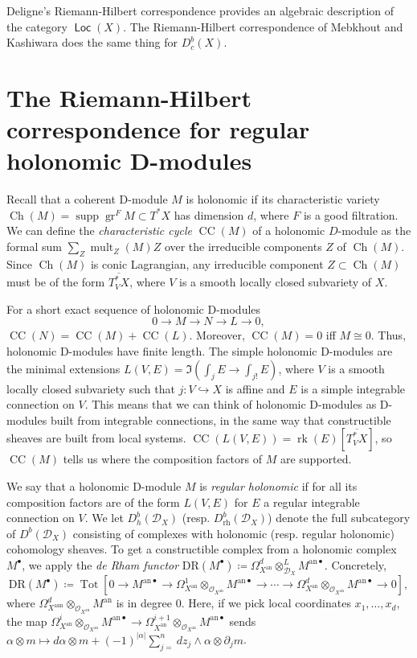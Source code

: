 \documentclass[leqno, openany]{memoir}
\theoremstyle{definition}
\theoremstyle{remark}
\theoremstyle{plain}
\theoremstyle{definition}
\theoremstyle{remark}
\newcommand{\mc}[1]{\mathcal{#1}}
\newcommand{\mr}[1]{\mathrm{#1}}
\newcommand{\on}[1]{\operatorname{#1}}
\newcommand{\ms}[1]{\mathsf{#1}}
\DeclareMathOperator{\supp}{supp}
\DeclareMathOperator{\Loc}{\ms{Loc}}
\DeclareMathOperator{\gr}{gr}
\DeclareMathOperator{\Ch}{Ch}
\DeclareMathOperator{\CC}{CC}
\DeclareMathOperator{\mult}{mult}
\DeclareMathOperator{\Tot}{Tot}
\begin{document}
Deligne's Riemann-Hilbert correspondence provides an algebraic description of the category $\Loc(X)$. The Riemann-Hilbert correspondence of Mebkhout and Kashiwara does the same thing for $D_c^b(X)$.

\section{The Riemann-Hilbert correspondence for regular holonomic D-modules}
Recall that a coherent D-module $M$ is holonomic if its characteristic variety $\Ch(M) = \supp\gr^FM \subset T^*X$ has dimension $d$, where $F$ is a good filtration. We can define the \textit{characteristic cycle} $\CC(M)$ of a holonomic $D$-module as the formal sum $\sum_Z\mult_Z(M)Z$ over the irreducible components $Z$ of $\Ch(M)$. Since $\Ch(M)$ is conic Lagrangian, any irreducible component $Z \subset \Ch(M)$ must be of the form $\overline{T_V^*X}$, where $V$ is a smooth locally closed subvariety of $X$.

For a short exact sequence of holonomic D-modules $$0 \to M \to N \to L \to 0,$$ $\CC(N) = \CC(M) + \CC(L)$. Moreover, $\CC(M) = 0$ iff $M \cong 0$. Thus, holonomic D-modules have finite length. The simple holonomic D-modules are the minimal extensions $L(V,E) = \Im\left(\int_jE \to \int_{j!}E\right)$, where $V$ is a smooth locally closed subvariety such that $j: V \hookrightarrow X$ is affine and $E$ is a simple integrable connection on $V$. This means that we can think of holonomic D-modules as D-modules built from integrable connections, in the same way that constructible sheaves are built from local systems. $\CC(L(V,E)) = \on{rk}(E)[\overline{T_V^*X}]$, so $\CC(M)$ tells us where the composition factors of $M$ are supported.

We say that a holonomic D-module $M$ is \textit{regular holonomic} if for all its composition factors are of the form $L(V,E)$ for $E$ a regular integrable connection on $V$. We let $D_h^b(\mc{D}_X)$ (resp. $D_{\mr{rh}}^b(\mc{D}_X)$) denote the full subcategory of $D^b(\mc{D}_X)$ consisting of complexes with holonomic (resp. regular holonomic) cohomology sheaves. To get a constructible complex from a holonomic complex $M^{\bullet}$, we apply the \textit{de Rham functor} $\mr{DR}(M^{\bullet}) \coloneqq \Omega_{X^{\mr{an}}}^d \otimes_{\mc{D}_X}^L M^{\mr{an}\bullet}$. Concretely, $$\mr{DR}(M^{\bullet}) \coloneqq \Tot[0 \to M^{\mr{an}\bullet} \to \Omega_{X^{\mr{an}}}^1 \otimes_{\mathcal{O}_{X^{\mr{an}}}} M^{\mr{an}\bullet} \to \cdots \to \Omega_{X^{\mr{an}}}^d \otimes_{\mathcal{O}_{X^{\mr{an}}}} M^{\mr{an}\bullet} \to 0],$$ where $\Omega_{X^{\mr{ann}}}^d \otimes_{\mathcal{O}_{X^{\mr{an}}}} M^{\mr{an}}$ is in degree 0. Here, if we pick local coordinates $x_1,\ldots,x_d$, the map $\Omega_{X^{\mr{an}}}^i \otimes_{\mathcal{O}_{X^{\mr{an}}}} M^{\mr{an}\bullet} \to \Omega_{X^{\mr{an}}}^{i + 1} \otimes_{\mathcal{O}_{X^{\mr{an}}}} M^{\mr{an}\bullet}$ sends $\alpha \otimes m \mapsto d\alpha \otimes m + (-1)^{|\alpha|}\sum_{j = }^ndz_j \wedge \alpha \otimes \partial_jm$.
\end{document}
